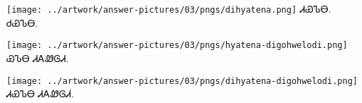 \documentclass[avery5371,frame]{flashcards}%
\begin{document}
\begin{flashcard}{
\texttt{[image: ../artwork/answer-pictures/03/pngs/dihyatena.png]}
}\Huge ᏗᏯᏖᎾ.\\ᏧᏯᏖᎾ.
\end{flashcard}

\begin{flashcard}{
\texttt{[image: ../artwork/answer-pictures/03/pngs/hyatena-digohwelodi.png]}
}\Huge ᏯᏖᎾ ᏗᎪᏪᎶᏗ.
\end{flashcard}

\begin{flashcard}{
\texttt{[image: ../artwork/answer-pictures/03/pngs/dihyatena-digohwelodi.png]}
}\Huge ᏗᏯᏖᎾ ᏗᎪᏪᎶᏗ.
\end{flashcard}
\end{document}
